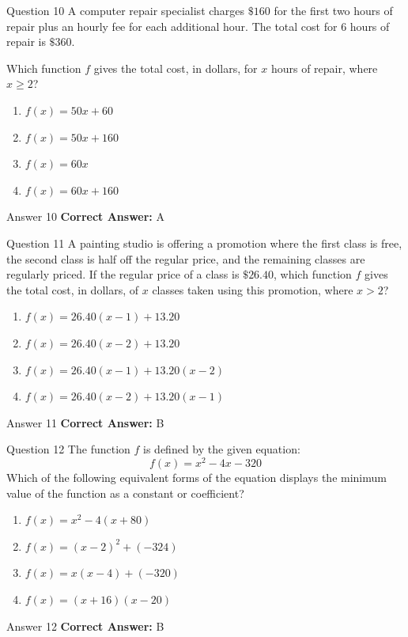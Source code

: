 \documentclass{beamer}
\begin{document}
\begin{frame}{Question 10}
\small
A computer repair specialist charges \(\$160\) for the first two hours of repair plus an hourly fee for each additional hour. The total cost for \(6\) hours of repair is \(\$360\).

Which function \(f\) gives the total cost, in dollars, for \(x\) hours of repair, where \(x \geq 2\)?
\vspace{0.35cm}
\begin{enumerate}
    \item[A.] \(f(x) = 50x + 60\)
    \item[B.] \(f(x) = 50x + 160\)
    \item[C.] \(f(x) = 60x\)
    \item[D.] \(f(x) = 60x + 160\)
\end{enumerate}
\end{frame}
\begin{frame}{Answer 10}
\small
\textbf{Correct Answer:} A
\end{frame}

\begin{frame}{Question 11}
\small
A painting studio is offering a promotion where the first class is free, the second class is half off the regular price, and the remaining classes are regularly priced. If the regular price of a class is \(\$26.40\), which function \(f\) gives the total cost, in dollars, of \(x\) classes taken using this promotion, where \(x > 2\)?
\vspace{0.35cm}
\begin{enumerate}
    \item[A.] \(f(x) = 26.40(x - 1) + 13.20\)
    \item[B.] \(f(x) = 26.40(x - 2) + 13.20\)
    \item[C.] \(f(x) = 26.40(x - 1) + 13.20(x - 2)\)
    \item[D.] \(f(x) = 26.40(x - 2) + 13.20(x - 1)\)
\end{enumerate}
\end{frame}
\begin{frame}{Answer 11}
\small
\textbf{Correct Answer:} B
\end{frame}

\begin{frame}{Question 12}
\small
The function \(f\) is defined by the given equation:
\[
f(x) = x^2 - 4x - 320
\]
Which of the following equivalent forms of the equation displays the minimum value of the function as a constant or coefficient?
\vspace{0.35cm}
\begin{enumerate}
    \item[A.] \(f(x) = x^2 - 4(x + 80)\)
    \item[B.] \(f(x) = (x - 2)^2 + (-324)\)
    \item[C.] \(f(x) = x(x - 4) + (-320)\)
    \item[D.] \(f(x) = (x + 16)(x - 20)\)
\end{enumerate}
\end{frame}
\begin{frame}{Answer 12}
\small
\textbf{Correct Answer:} B
\end{frame}
\end{document}

